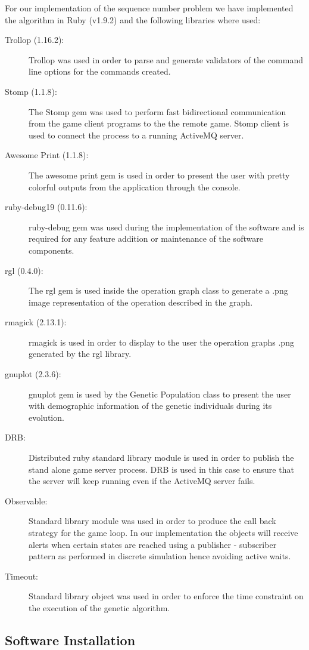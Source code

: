 \documentclass[a4paper,10pt,titlepage]{article}
\begin{document}
\par For our implementation of the sequence number problem we have implemented the algorithm in Ruby (v1.9.2) and the following libraries where used: 
\begin{description}
	\item[Trollop (1.16.2):] Trollop was used in order to parse and generate validators of the command line options for the  commands created. 
	\item[Stomp (1.1.8):] The Stomp gem was used to perform fast bidirectional communication from the game client programs to the the remote game. Stomp client is used to connect the process to a running ActiveMQ server.
	\item[Awesome Print (1.1.8):] The awesome print gem is used in order to present the user with pretty colorful outputs from the application through the console. 
	\item[ruby-debug19 (0.11.6):] ruby-debug gem was used during the implementation of the software and is required for any feature addition or maintenance of the software components. 
	\item[rgl (0.4.0):] The rgl gem is used inside the operation graph class to generate a .png image representation of the operation described in the graph.
	\item[rmagick (2.13.1):] rmagick is used in order to display to the user the operation graphs .png generated by the rgl library. 
	\item[gnuplot (2.3.6):] gnuplot gem is used by the Genetic Population class to present the user with demographic information of the genetic individuals during its evolution. 
	\item[DRB:] Distributed ruby standard library module is used in order to publish the stand alone game server process. DRB is used in this case to ensure that the server will keep running even if the ActiveMQ server fails. 
	\item[Observable:] Standard library module was used in order to produce the call back strategy for the game loop. In our implementation the objects will receive alerts when certain states are reached using a publisher - subscriber pattern as performed in discrete simulation hence avoiding active waits. 
	\item[Timeout:] Standard library object was used in order to enforce the time constraint on the execution of the genetic algorithm.
\end{description}

\subsection{Software Installation}
\end{document}
